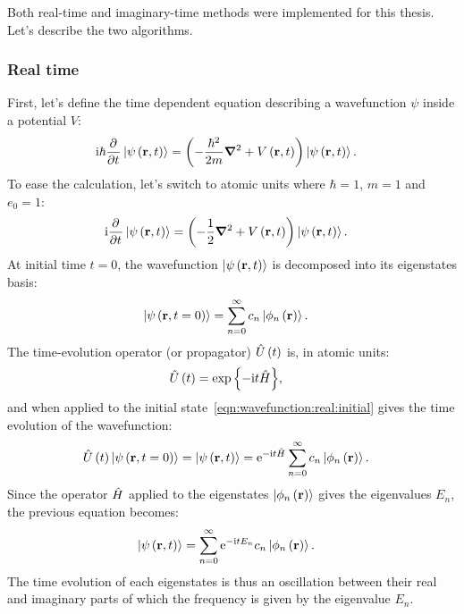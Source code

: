 Both real-time and imaginary-time methods were implemented for this thesis. Let's describe the
two algorithms.


\subsubsection{Real time}

First, let's define the time dependent \schrodinger equation describing a
wavefunction $\psi$ inside a potential $V$:
\begin{align}
\textrm{i} \hbar \frac{\partial^{{}}   }{\partial t^{{}}} \left| \psi\left( \textbf{r}, t \right) \right>
    & = \left( -\frac{\hbar^2}{2 m} \bm{\nabla}^2 + V\left( \textbf{r}, t \right)  \right) \left| \psi\left( \textbf{r},
t \right) \right>.
\label{eqn:schrodinger:si}
\end{align}
To ease the calculation, let's switch to atomic units where $\hbar = 1$, $m
= 1$ and $e_0 = 1$:
\begin{align}
\textrm{i} \frac{\partial^{{}}   }{\partial t^{{}}} \left| \psi\left( \textbf{r}, t \right) \right>
    & = \left( -\frac{1}{2} \bm{\nabla}^2 + V\left( \textbf{r}, t \right)  \right) \left| \psi\left( \textbf{r}, t \right) \right>.
\label{eqn:schrodinger:au}
\end{align}
At initial time $t = 0$, the wavefunction $\left| \psi\left( \textbf{r}, t \right) \right>$ is
decomposed into its eigenstates basis:
\begin{align}
\left| \psi\left( \textbf{r}, t=0 \right) \right> & = \sum_{n=0}^{\infty} c_n \left| \phi_n\left( \textbf{r} \right) \right>.
\label{eqn:wavefunction:real:initial}
\end{align}
The time-evolution operator (or propagator) $\hat{U}\left( t \right)$ is, in atomic units:
\begin{align}
\hat{U}\left( t \right) & = \exp{ \left\{  - \textrm{i}t  \hat{H} \right\}},
\label{eqn:propagator:real}
\end{align}
and when applied to the initial state~\eqref{eqn:wavefunction:real:initial}
gives the time evolution of the wavefunction:
\begin{align}
\hat{U}\left( t \right) \left| \psi\left( \textbf{r}, t=0 \right) \right>
    = \left| \psi\left( \textbf{r}, t \right) \right>
  & = \textrm{e}^{ - \textrm{i} t \hat{H} } \sum_{n=0}^{\infty} c_n \left| \phi_n\left( \textbf{r} \right) \right>.
\end{align}
Since the operator $\hat{H}$ applied to the eigenstates
$\left| \phi_n\left( \textbf{r} \right) \right>$ gives the eigenvalues $E_n$, the previous equation
becomes:
\begin{align}
\left| \psi\left( \textbf{r}, t \right) \right>
 & = \sum_{n=0}^{\infty} \textrm{e}^{ - \textrm{i} t E_n } c_n \left| \phi_n\left( \textbf{r} \right) \right>.
\label{eqn:wavefunction:eigenstates:time_evolution:real}
\end{align}
The time evolution of each eigenstates is thus an oscillation between their real
and imaginary parts of which the frequency is given by the eigenvalue $E_n$.




